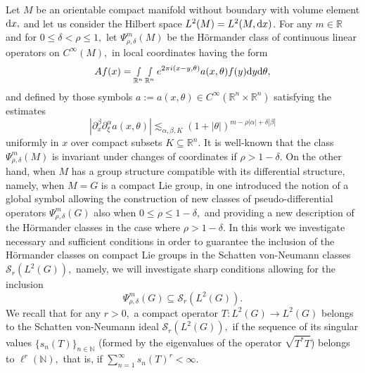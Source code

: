 \documentclass[12pt, reqno]{amsart}
\theoremstyle{definition}
\theoremstyle{remark}
\numberwithin{equation}{section}
\begin{document}
Let $M$ be an orientable compact manifold without boundary with volume element $\textnormal{d}x,$ and let us consider the Hilbert space $L^2(M)=L^2(M,\textnormal{d}x)$. For any $m\in \mathbb{R}$ and for $0\leq \delta<\rho\leq 1,$ let $\Psi^m_{\rho,\delta}(M)$ be the H\"ormander class of continuous linear operators on $C^\infty(M),$ in local coordinates having the form
\begin{equation}
    Af(x)=\smallint_{\mathbb{R}^n}\smallint_{\mathbb{R}^n}e^{2\pi i(x-y,\theta)}a(x,\theta)f(y)\textnormal{d}y\textnormal{d}\theta,
\end{equation}and defined by those symbols $a:=a(x,\theta)\in C^\infty(\mathbb{R}^n\times \mathbb{R}^n)$ satisfying the estimates
\begin{equation}
    |\partial_x^\beta\partial_\xi^\alpha a(x,\theta)|\lesssim_{\alpha,\beta,K}  (1+|\theta|)^{m-\rho|\alpha|+\delta|\beta|}
\end{equation} uniformly in $x$ over compact subsets $K\subseteq \mathbb{R}^n.
$ It is
%
%
%
well-known that the class $\Psi^m_{\rho,\delta}(M)$ is invariant under changes of coordinates if $\rho>1-\delta.$ On the other hand, when $M$ has a group structure compatible with its differential structure, namely, when $M=G$ is a compact Lie group, in \cite{Ruz,RuzhanskyTurunenWirth2014} one  introduced the notion of a global symbol allowing the construction of new classes of pseudo-differential operators $\Psi^m_{\rho,\delta}(G)$ also when $0\leq\rho\leq 1-\delta,$ and providing a new description of the H\"ormander classes in the case where $\rho>1-\delta.$ In this work we investigate necessary and sufficient conditions in order to guarantee the inclusion of the H\"ormander classes on compact Lie groups in the Schatten von-Neumann classes $\mathscr{S}_{r}(L^2(G)),$ namely, we will investigate sharp conditions allowing for  the  inclusion 
\begin{equation}\label{main:problem}
 \Psi^m_{\rho,\delta}(G)\subseteq \mathscr{S}_{r}(L^2(G)).   
\end{equation}
We recall that for any $r>0,$ a compact operator $T :L^2(G)\rightarrow L^2(G) $ belongs to the Schatten von-Neumann ideal $\mathscr{S}_{r}(L^2(G)),$ if the sequence of its singular values $\{s_{n}(T)\}_{n\in \mathbb{N}}$ (formed by the eigenvalues of the operator $\sqrt{T^*T}$) belongs to $\ell^r(\mathbb{N}),$ that is, if  $\sum_{n=1}^\infty s_{n}(T)^r<\infty.$
\end{document}
